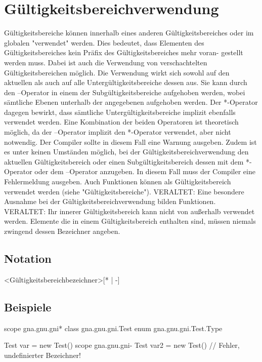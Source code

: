\chapter{Gültigkeitsbereichverwendung}
Gültigkeitsbereiche können innerhalb eines anderen Gültigkeitsbereiches oder im globalen "verwendet" werden.
Dies bedeutet, dass Elementen des Gültigkeitsbereiches kein Präfix des Gültigkeitsbereiches mehr voran-
gestellt werden muss.
Dabei ist auch die Verwendung von verschachtelten Gültigkeitsbereichen möglich.
Die Verwendung wirkt sich sowohl auf den aktuellen als auch auf alle Untergültigkeitsbereiche dessen aus.
Sie kann durch den --Operator in einem der Subgültigkeitsbereiche aufgehoben werden, wobei sämtliche Ebenen unterhalb der angegebenen
aufgehoben werden.
Der *-Operator dagegen bewirkt, dass sämtliche Untergültigkeitsbereiche implizit ebenfalls verwendet werden.
Eine Kombination der beiden Operatoren ist theoretisch möglich, da der --Operator implizit den *-Operator verwendet, aber nicht notwendig.
Der Compiler sollte in diesem Fall eine Warnung ausgeben.
Zudem ist es unter keinen Umständen möglich, bei der Gültigkeitsbereichverwendung den aktuellen Gültigkeitsbereich oder einen Subgültigkeitsbereich
dessen mit dem *-Operator oder dem --Operator anzugeben.
In diesem Fall muss der Compiler eine Fehlermeldung ausgeben.
Auch Funktionen können als Gültigkeitsbereich verwendet werden (siehe "Gültigkeitsbereiche").
VERALTET: Eine besondere Ausnahme bei der Gültigkeitsbereichverwendung bilden Funktionen.
VERALTET: Ihr innerer Gültigkeitsbereich kann nicht von außerhalb verwendet werden.
Elemente die in einem Gültigkeitsbereich enthalten sind, müssen niemals zwingend dessen Bezeichner angeben.

\section{Notation}
<Gültigkeitsbereichbezeichner>[* | -]

\section{Beispiele}
scope gna.gnu.gni*
class gna.gnu.gni.Test
enum gna.gnu.gni.Test.Type

Test var = new Test()
scope gna.gnu.gni-
Test var2 = new Test() // Fehler, undefinierter Bezeichner!